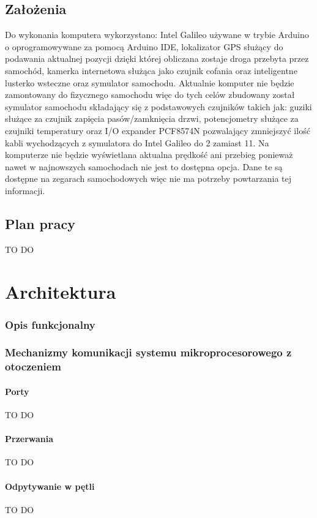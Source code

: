 \documentclass{xmgr}
\begin{document}
\section{Założenia}
Do wykonania komputera wykorzystano: Intel Galileo używane w trybie Arduino o oprogramowywane za pomocą Arduino IDE, lokalizator GPS służący do podawania aktualnej pozycji dzięki której obliczana zostaje droga przebyta przez samochód, kamerka internetowa służąca jako czujnik cofania oraz inteligentne lusterko wsteczne oraz symulator samochodu. Aktualnie komputer nie będzie zamontowany do fizycznego samochodu więc do tych celów zbudowany został symulator samochodu składający się z podstawowych czujników takich jak: guziki służące za czujnik zapięcia pasów/zamknięcia drzwi, potencjometry służące za czujniki temperatury oraz I/O expander PCF8574N pozwalający zmniejszyć ilość kabli wychodzących z symulatora do Intel Galileo do 2 zamiast 11. Na komputerze nie będzie wyświetlana aktualna prędkość ani przebieg ponieważ nawet w najnowszych samochodach nie jest to dostępna opcja. Dane te są dostępne na zegarach samochodowych więc nie ma potrzeby powtarzania tej informacji.
\section{Plan pracy}
TO DO

\chapter{Architektura}
\subsection{Opis funkcjonalny}
\subsection{Mechanizmy komunikacji systemu mikroprocesorowego z otoczeniem}
\subsubsection{Porty}
TO DO
\subsubsection{Przerwania}
TO DO
\subsubsection{Odpytywanie w pętli}
TO DO
\end{document}
